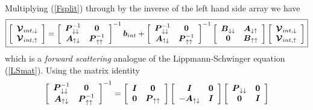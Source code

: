 Multiplying (\ref{Fsplit}) through by the inverse of the left hand side 
array we have 
\begin{equation}\label{LSmatF}
\fbox{$\displaystyle
\left[{\begin{array}{c}{\mbox{\boldmath$\cal V$\unboldmath}}_{int, \downarrow }\\ {\mbox{\boldmath$\cal V$\unboldmath}}_{int, \uparrow 
}\end{array}}\right]=
\left[{\begin{array}{cc}{\mbox{\boldmath$\mit P$\unboldmath}}_{ \downarrow \downarrow }^{-1}&{\bf 0}\\ 
{\mbox{\boldmath$\mit A$\unboldmath}}_{ \uparrow \downarrow }&{\mbox{\boldmath$\mit P$\unboldmath}}_{ \uparrow \uparrow 
}^{-1}\end{array}}\right]^{-1}{\mbox{\boldmath$\mit b$\unboldmath}}_{int}+
\left[{\begin{array}{cc}{\mbox{\boldmath$\mit P$\unboldmath}}_{ \downarrow \downarrow }^{-1}&{\bf 0}\\ 
{\mbox{\boldmath$\mit A$\unboldmath}}_{ \uparrow \downarrow }&{\mbox{\boldmath$\mit P$\unboldmath}}_{ \uparrow \uparrow 
}^{-1}\end{array}}\right]^{-1}\left[{\begin{array}{cc}{\mbox{\boldmath$\mit B$\unboldmath}}_{ \downarrow 
\downarrow }&{\mbox{\boldmath$\mit A$\unboldmath}}_{ \downarrow \uparrow }\\ {\bf 0}&{\mbox{\boldmath$\mit B$\unboldmath}}_{ \uparrow \uparrow 
}\end{array}}\right]\left[{\begin{array}{c}{\mbox{\boldmath$\cal V$\unboldmath}}_{int, \downarrow }\\ 
{\mbox{\boldmath$\cal V$\unboldmath}}_{int, \uparrow }\end{array}}\right]
$}
\end{equation} 
which is a {\em forward scattering\/} analogue of the Lippmann-Schwinger 
equation (\ref{LSmat}).  Using the matrix identity
\[
{\left[{\begin{array}{cc}{\mbox{\boldmath$\mit P$\unboldmath}}_{ \downarrow \downarrow }^{-1}&{\bf 0}\\
{\mbox{\boldmath$\mit A$\unboldmath}}_{ \uparrow \downarrow }&{\mbox{\boldmath$\mit P$\unboldmath}}_{ \uparrow \uparrow }^{-1}\end{array}}\right]}^{-1}=
\left[{\begin{array}{cc}{\mbox{\boldmath$\mit I$\unboldmath}}&{\bf 0}\\
{\bf 0}&{\mbox{\boldmath$\mit P$\unboldmath}}_{ \uparrow \uparrow }\end{array}}\right]
\left[{\begin{array}{cc}{\mbox{\boldmath$\mit I$\unboldmath}}&{\bf 0}\\
-{\mbox{\boldmath$\mit A$\unboldmath}}_{ \uparrow \downarrow }&{\mbox{\boldmath$\mit I$\unboldmath}}\end{array}}\right]
\left[{\begin{array}{cc}{\mbox{\boldmath$\mit P$\unboldmath}}_{ \downarrow \downarrow }&{\bf 0}\\{\bf 
0}&{\mbox{\boldmath$\mit I$\unboldmath}}\end{array}}\right]
\]
